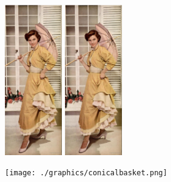 \begin{texexample}{}{}
\begin{figure}
    \includegraphics[width=70pt]{./images/parasol-01.jpg}
    \includegraphics[width=70pt]{./images/parasol-01.jpg}
 \end{figure}

\lipsum[1-3]\lorem
\end{texexample}




\begin{texexample}{}{}
\begin{figure}
    \texttt{[image: ./graphics/conicalbasket.png]}
\end{figure}

\onepar\onepar\onepar

\end{texexample}



